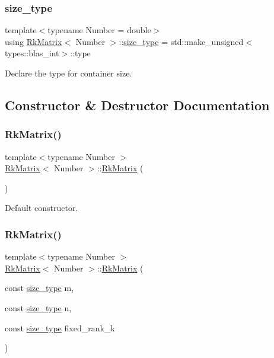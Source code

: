 \subsubsection{\texorpdfstring{size\+\_\+type}{size\_type}}
{\footnotesize\ttfamily template$<$typename Number = double$>$ \\
using \hyperlink{classRkMatrix}{Rk\+Matrix}$<$ Number $>$\+::\hyperlink{classRkMatrix_add060bfc3a4cc77f858c3d6dd58cadd5}{size\+\_\+type} =  std\+::make\+\_\+unsigned$<$types\+::blas\+\_\+int$>$\+::type}

Declare the type for container size. 

\subsection{Constructor \& Destructor Documentation}
\mbox{\label{classRkMatrix_aa2753ce8e37595824ac275e6b26255cf}} 
\subsubsection{\texorpdfstring{Rk\+Matrix()}{RkMatrix()}\hspace{0.1cm}{\footnotesize\ttfamily [1/19]}}
{\footnotesize\ttfamily template$<$typename Number $>$ \\
\hyperlink{classRkMatrix}{Rk\+Matrix}$<$ Number $>$\+::\hyperlink{classRkMatrix}{Rk\+Matrix} (\begin{DoxyParamCaption}{ }\end{DoxyParamCaption})}

Default constructor. \mbox{\label{classRkMatrix_a2ed616a9c4e1b12688a903b427260241}} 
\subsubsection{\texorpdfstring{Rk\+Matrix()}{RkMatrix()}\hspace{0.1cm}{\footnotesize\ttfamily [2/19]}}
{\footnotesize\ttfamily template$<$typename Number $>$ \\
\hyperlink{classRkMatrix}{Rk\+Matrix}$<$ Number $>$\+::\hyperlink{classRkMatrix}{Rk\+Matrix} (\begin{DoxyParamCaption}\item[{const \hyperlink{classRkMatrix_add060bfc3a4cc77f858c3d6dd58cadd5}{size\+\_\+type}}]{m,  }\item[{const \hyperlink{classRkMatrix_add060bfc3a4cc77f858c3d6dd58cadd5}{size\+\_\+type}}]{n,  }\item[{const \hyperlink{classRkMatrix_add060bfc3a4cc77f858c3d6dd58cadd5}{size\+\_\+type}}]{fixed\+\_\+rank\+\_\+k }\end{DoxyParamCaption})}

